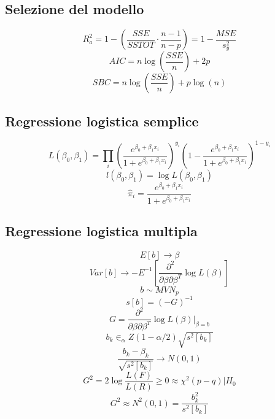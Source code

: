 \documentclass[a4paper, landscape]{article}
\begin{document}
\begin{multicols}{3}
\subsection{Selezione del modello}
\begin{equation}
R^2_a=1-(\frac{SSE}{SSTOT}\cdot\frac{n-1}{n-p})=1-\frac{MSE}{s^2_y} \end{equation}
\begin{equation} AIC=n\log(\frac{SSE}{n})+2p\end{equation}
\begin{equation}
SBC=n\log(\frac{SSE}{n})+p\log(n)
\end{equation}
\subsection{Regressione logistica semplice}
\begin{equation}
L(\beta_0,\beta_1)=\prod_i(\frac{e^{\beta_0+\beta_1x_i}}{1+e^{\beta_0+\beta_1x_i}})^{y_i}(1-\frac{e^{\beta_0+\beta_1x_i}}{1+e^{\beta_0+\beta_1x_i}})^{1-y_i} \end{equation}
\begin{equation}
l(\beta_0,\beta_1)=\log L(\beta_0,\beta_1) \end{equation}
\begin{equation}
\hat{\pi}_i=\frac{e^{\beta_0+\beta_1x_i}}{1+e^{\beta_0+\beta_1x_i}}
\end{equation}
\subsection{Regressione logistica multipla}
\begin{equation}
E[b]\longrightarrow\beta \end{equation}
\begin{equation} Var[b]\longrightarrow-E^{-1}[\frac{\partial^2}{\partial\beta\partial\beta^T}\log L(\beta)]\end{equation}
\begin{equation}
b\sim MVN_p \end{equation}
\begin{equation} s[b]=(-G)^{-1} \end{equation}
\begin{equation}
G = \frac{\partial^2}{\partial\beta\partial\beta^T}\log L(\beta)|_{\beta=b} \end{equation}
\begin{equation} b_k\in_\alpha Z(1-\alpha/2)\sqrt{s^2[b_k]}\end{equation}
\begin{equation}
\frac{b_k-\beta_k}{\sqrt{s^2[b_k]}}\longrightarrow N(0,1) \end{equation}
\begin{equation} G^2 = 2\log\frac{L(F)}{L(R)}\geq 0\approx \chi^2(p-q)|H_0\end{equation}
\begin{equation}
G^2\approx N^2(0,1) = \frac{b_k^2}{s^2[b_k]}
\end{equation}

\end{multicols}
\end{document}

